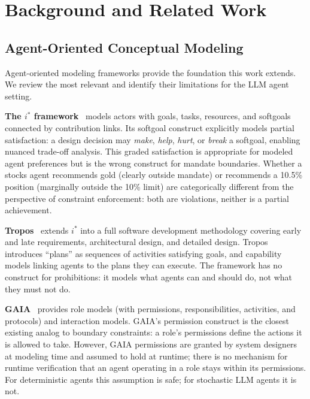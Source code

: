 \documentclass[runningheads]{llncs}
\begin{document}
\section{Background and Related Work}
\label{sec:background}

\subsection{Agent-Oriented Conceptual Modeling}

Agent-oriented modeling frameworks provide the foundation this work
extends. We review the most relevant and identify their limitations for
the LLM agent setting.

\textbf{The $i^*$ framework}~\cite{yu2011social} models actors with
goals, tasks, resources, and softgoals connected by contribution links.
Its softgoal construct explicitly models partial satisfaction: a design
decision may \emph{make}, \emph{help}, \emph{hurt}, or \emph{break} a
softgoal, enabling nuanced trade-off analysis. This graded satisfaction
is appropriate for modeled agent preferences but is the wrong construct
for mandate boundaries. Whether a stocks agent recommends gold (clearly
outside mandate) or recommends a 10.5\% position (marginally outside the
10\% limit) are categorically different from the perspective of
constraint enforcement: both are violations, neither is a partial
achievement.

\textbf{Tropos}~\cite{bresciani2004tropos} extends $i^*$ into a
full software development methodology covering early and late
requirements, architectural design, and detailed design. Tropos
introduces ``plans'' as sequences of activities satisfying goals, and
capability models linking agents to the plans they can execute. The
framework has no construct for prohibitions: it models what agents can
and should do, not what they must not do.

\textbf{GAIA}~\cite{wooldridge2000gaia} provides role models (with
permissions, responsibilities, activities, and protocols) and interaction
models. GAIA's permission construct is the closest existing analog to
boundary constraints: a role's permissions define the actions it is
allowed to take. However, GAIA permissions are granted by system
designers at modeling time and assumed to hold at runtime; there is no
mechanism for runtime verification that an agent operating in a role
stays within its permissions. For deterministic agents this assumption
is safe; for stochastic LLM agents it is not.
\end{document}
